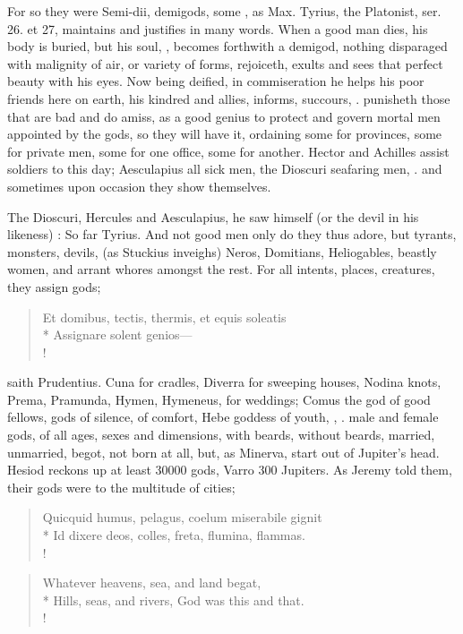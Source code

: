 {For so they were Semi-dii, demigods, some ,
as Max. Tyrius, the Platonist, ser. 26. et 27, maintains and
justifies in many words. When a good man dies, his body is buried, but
his soul, , becomes forthwith a demigod, nothing
disparaged with malignity of air, or variety of forms, rejoiceth,
exults and sees that perfect beauty with his eyes. Now being deified,
in commiseration he helps his poor friends here on earth, his kindred
and allies, informs, succours, \etc{}. punisheth those that are bad and do
amiss, as a good genius to protect and govern mortal men appointed by
the gods, so they will have it, ordaining some for provinces, some for
private men, some for one office, some for another. Hector and Achilles
assist soldiers to this day; Aesculapius all sick men, the Dioscuri
seafaring men, \etc{}. and sometimes upon occasion they show themselves.

The Dioscuri, Hercules and Aesculapius, he saw himself (or the devil in
his likeness) : So far Tyrius. And
not good men only do they thus adore, but tyrants, monsters, devils,
(as  Stuckius inveighs) Neros, Domitians, Heliogables, beastly
women, and arrant whores amongst the rest. For all intents, places,
creatures, they assign gods;

\begin{latin}
\begin{verse}%
Et domibus, tectis, thermis, et equis soleatis\\*
Assignare solent genios---\\!
\end{verse}%
\end{latin}

saith Prudentius. Cuna for cradles, Diverra for sweeping houses, Nodina
knots, Prema, Pramunda, Hymen, Hymeneus, for weddings; Comus the god of
good fellows, gods of silence, of comfort, Hebe goddess of youth, , \etc{}. male and female gods, of all ages, sexes and
dimensions, with beards, without beards, married, unmarried, begot, not
born at all, but, as Minerva, start out of Jupiter's head. Hesiod
reckons up at least 30\thinspace{}000 gods, Varro 300 Jupiters. As Jeremy told
them, their gods were to the multitude of cities;

\begin{latin}
\begin{verse}%
Quicquid humus, pelagus, coelum miserabile gignit\\*
Id dixere deos, colles, freta, flumina, flammas.\\!
\end{verse}%
\end{latin}
\translationrule%
\begin{verse}%
Whatever heavens, sea, and land begat,\\*
Hills, seas, and rivers, God was this and that.\\!
\end{verse}%

}
